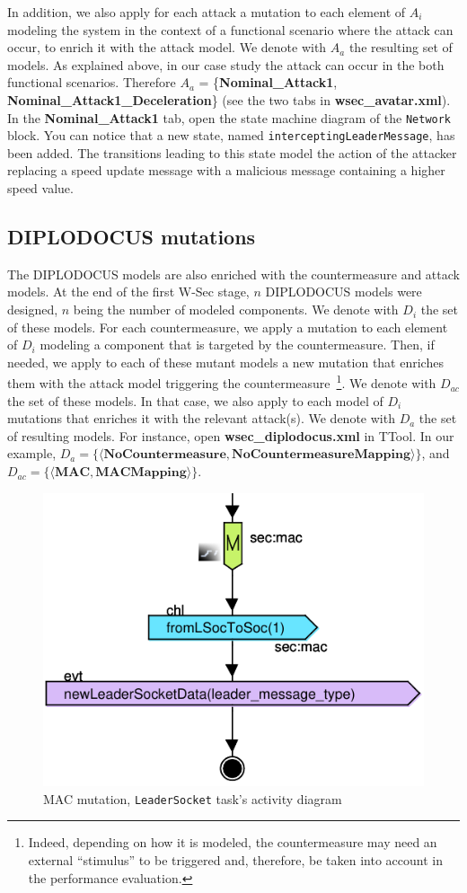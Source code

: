\documentclass{article}
\begin{document}
In addition, we also apply for each attack a mutation to each element of $A_i$ modeling the system in the context of a functional scenario where the attack can occur, to enrich it with the attack model. We denote with $A_a$ the resulting set of models. As explained above, in our case study the attack can occur in the both functional scenarios. Therefore $A_a$ = \{\textbf{Nominal\_Attack1}, \textbf{Nominal\_Attack1\_Deceleration}\} (see the two tabs in \textbf{wsec\_avatar.xml}). In the \textbf{Nominal\_Attack1} tab, open the state machine diagram of the \texttt{Network} block. You can notice that a new state, named \texttt{interceptingLeaderMessage}, has been added. The transitions leading to this state model the action of the attacker replacing a speed update message with a malicious message containing a higher speed value.


\subsection{DIPLODOCUS mutations}

The DIPLODOCUS models are also enriched with the countermeasure and attack models. At the end of the first W-Sec stage, $n$ DIPLODOCUS models were designed, $n$ being the number of modeled components. We denote with $D_i$ the set of these models. For each countermeasure, we apply a mutation to each element of $D_i$ modeling a component that is targeted by the countermeasure. Then, if needed, we apply to each of these mutant models a new mutation that enriches them with the attack model triggering the countermeasure~\footnote{Indeed, depending on how it is modeled, the countermeasure may need an external ``stimulus'' to be triggered and, therefore, be taken into account in the performance evaluation.}. We denote with $D_{a c}$ the set of these models. In that case, we also apply to each model of $D_i$ mutations that enriches it with the relevant attack(s). We denote with $D_a$ the set of resulting models. For instance, open \textbf{wsec\_diplodocus.xml} in TTool. In our example, $D_a = \{\langle \textbf{NoCountermeasure}, \textbf{NoCountermeasureMapping} \rangle\}$, and $D_{a c} = \{\langle \textbf{MAC}, \textbf{MACMapping} \rangle\}$.

\begin{figure}
	\centering
	\includegraphics[width=.5\textwidth]{figures/leadersocketmac.pdf}
	\caption{MAC mutation, \texttt{LeaderSocket} task's activity diagram}
	\label{fig:leadersocketmac}
\end{figure}
\end{document}
